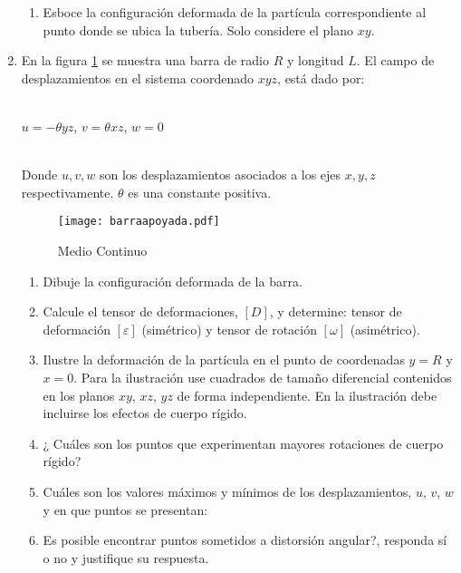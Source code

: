 \documentclass[../notas medios.tex]{subfiles}
\begin{document}
\begin{enumerate}
\begin{enumerate}
	\item Esboce la configuraci\'on deformada de la part\'icula correspondiente al punto donde se ubica la tuber\'ia. Solo considere el plano $xy$. 
\end{enumerate}
\newpage
\item \label{punto08_d} En la figura \cref{BarraApoya} se muestra una barra de radio $R$ y longitud $L$. El campo de desplazamientos   en el sistema coordenado $xyz$, est\'a dado por:\\
\\
\begin{large}
	\hspace*{20mm} $u= -\theta yz$, \hspace*{35mm} $v= \theta xz $, \hspace*{35mm}
	$w= 0  $\\
\end{large}
%
\\
%
Donde $u,v,w$ son los desplazamientos asociados a los ejes $x,y,z$ respectivamente. $\theta$ es una constante positiva. \\ 
\begin{figure}[H]
	\centering
	\texttt{[image: barraapoyada.pdf]} 
	\caption{Medio Continuo}
	\label{BarraApoya}
\end{figure}

\begin{enumerate}

\item Dibuje la configuraci\'on deformada de la barra. 
%
\item Calcule el tensor de deformaciones, $[D]$, y determine: tensor de deformaci\'on $[\varepsilon]$ (sim\'etrico) y tensor de rotaci\'on $[\omega]$ (asim\'etrico).
\item Ilustre la deformaci\'on de la part\'icula en el punto de coordenadas $y = R$ y $x = 0$. Para la ilustraci\'on use cuadrados de tama\~no diferencial contenidos en los planos $xy$, $xz$, $yz$ de forma independiente. En la ilustraci\'on debe incluirse los efectos de cuerpo r\'igido.
\item ¿ Cu\'ales son los puntos que experimentan mayores rotaciones de cuerpo r\'igido?
\item Cu\'ales son los valores m\'aximos y m\'inimos de los desplazamientos, $u$, $v$, $w$ y en que puntos se presentan:
\item  \textquestiondown Es posible encontrar puntos sometidos a distorsi\'on angular?, responda s\'i o no y justifique su respuesta.
%
\end{enumerate}


\end{enumerate}
\end{document}
